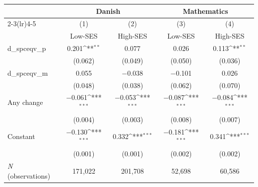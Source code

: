{
\def\sym#1{\ifmmode^{#1}\else\(^{#1}\)\fi}
\begin{tabular*}{\hsize}{@{\hskip\tabcolsep\extracolsep\fill}l*{4}{c}}
\toprule
            &\multicolumn{2}{c}{Danish}                 &\multicolumn{2}{c}{Mathematics}            \\\cmidrule(lr){2-3}\cmidrule(lr){4-5}
            &\multicolumn{1}{c}{(1)}&\multicolumn{1}{c}{(2)}&\multicolumn{1}{c}{(3)}&\multicolumn{1}{c}{(4)}\\
            &\multicolumn{1}{c}{Low-SES}&\multicolumn{1}{c}{High-SES}&\multicolumn{1}{c}{Low-SES}&\multicolumn{1}{c}{High-SES}\\
\midrule
d\_spceqv\_p  &       0.201\sym{**} &       0.077         &       0.026         &       0.113\sym{**} \\
            &     (0.062)         &     (0.049)         &     (0.050)         &     (0.036)         \\
d\_spceqv\_m  &       0.055         &    $-$0.038         &    $-$0.101         &       0.026         \\
            &     (0.048)         &     (0.038)         &     (0.062)         &     (0.070)         \\
Any change  &    $-$0.061\sym{***}&    $-$0.053\sym{***}&    $-$0.087\sym{***}&    $-$0.084\sym{***}\\
            &     (0.004)         &     (0.003)         &     (0.008)         &     (0.007)         \\
Constant    &    $-$0.130\sym{***}&       0.332\sym{***}&    $-$0.181\sym{***}&       0.341\sym{***}\\
            &     (0.001)         &     (0.001)         &     (0.002)         &     (0.002)         \\
\midrule
 \textit{N} (observations)&     171,022         &     201,708         &      52,698         &      60,586         \\
\bottomrule
\end{tabular*}
}
